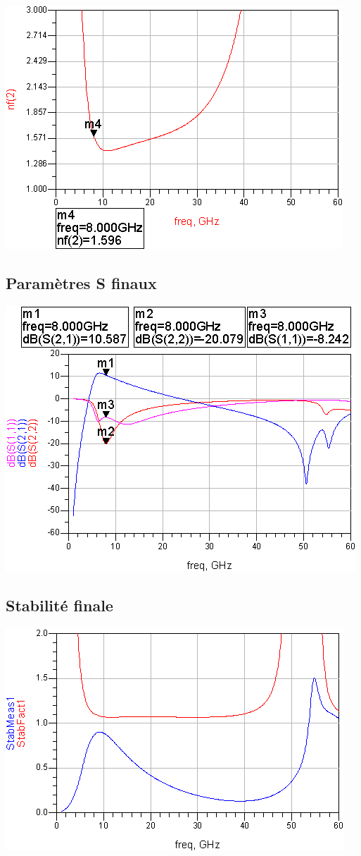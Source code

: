 \documentclass{article}
\begin{document}
\begin{centering}
\includegraphics{nf_end.png}

\subsection{Paramètres S finaux}

\includegraphics{Sparam.png}

\subsection{Stabilité finale}

\includegraphics{stab_end.png}


\end{centering}
\end{document}
